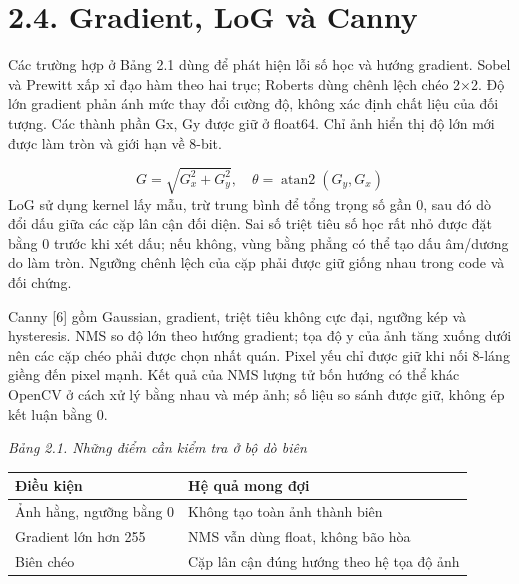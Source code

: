 \documentclass[13pt,a4paper]{extreport}
\begin{document}
\section*{2.4. Gradient, LoG và Canny}
Các trường hợp ở Bảng 2.1 dùng để phát hiện lỗi số học và hướng gradient. Sobel và Prewitt xấp xỉ đạo hàm theo hai trục; Roberts dùng chênh lệch chéo 2×2. Độ lớn gradient phản ánh mức thay đổi cường độ, không xác định chất liệu của đối tượng. Các thành phần Gx, Gy được giữ ở float64. Chỉ ảnh hiển thị độ lớn mới được làm tròn và giới hạn về 8-bit.
\par
\begin{equation}G=\sqrt{G_x^2+G_y^2},\quad \theta=\operatorname{atan2}(G_y,G_x)\tag{2.7}\end{equation}
LoG sử dụng kernel lấy mẫu, trừ trung bình để tổng trọng số gần 0, sau đó dò đổi dấu giữa các cặp lân cận đối diện. Sai số triệt tiêu số học rất nhỏ được đặt bằng 0 trước khi xét dấu; nếu không, vùng bằng phẳng có thể tạo dấu âm/dương do làm tròn. Ngưỡng chênh lệch của cặp phải được giữ giống nhau trong code và đối chứng.
\par
Canny [6] gồm Gaussian, gradient, triệt tiêu không cực đại, ngưỡng kép và hysteresis. NMS so độ lớn theo hướng gradient; tọa độ y của ảnh tăng xuống dưới nên các cặp chéo phải được chọn nhất quán. Pixel yếu chỉ được giữ khi nối 8-láng giềng đến pixel mạnh. Kết quả của NMS lượng tử bốn hướng có thể khác OpenCV ở cách xử lý bằng nhau và mép ảnh; số liệu so sánh được giữ, không ép kết luận bằng 0.
\par
\noindent\textit{Bảng 2.1. Những điểm cần kiểm tra ở bộ dò biên}
\begin{longtable}{p{7.3cm}|p{7.3cm}}
Điều kiện & Hệ quả mong đợi\\\hline
Ảnh hằng, ngưỡng bằng 0 & Không tạo toàn ảnh thành biên\\\hline
Gradient lớn hơn 255 & NMS vẫn dùng float, không bão hòa\\\hline
Biên chéo & Cặp lân cận đúng hướng theo hệ tọa độ ảnh\\\hline
\end{longtable}
\clearpage
\end{document}
